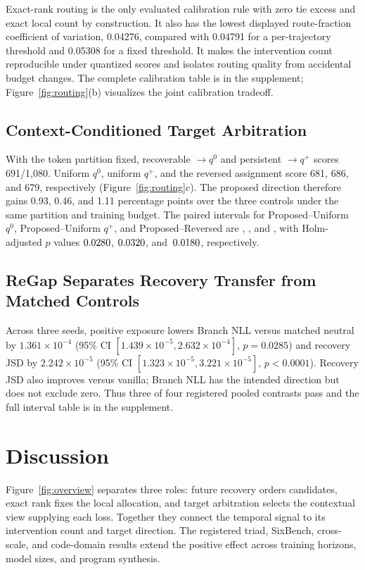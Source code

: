 \documentclass[letterpaper]{article}
\begin{document}
Exact-rank routing is the only evaluated calibration rule with zero tie excess
and exact local count by construction. It also has the lowest displayed
route-fraction coefficient of variation, 0.04276, compared with 0.04791 for a
per-trajectory threshold and 0.05308 for a fixed threshold. It makes the
intervention count reproducible under quantized scores
and isolates routing quality from accidental budget changes. The complete
calibration table is in the supplement; Figure~\ref{fig:routing}(b) visualizes
the joint calibration tradeoff.

\subsection{Context-Conditioned Target Arbitration}

With the token partition fixed, recoverable $\to q^0$ and persistent $\to q^+$
scores 691/1,080. Uniform $q^0$, uniform $q^+$, and the reversed assignment
score 681, 686, and 679, respectively (Figure~\ref{fig:routing}c). The proposed
direction therefore gains 0.93, 0.46, and 1.11 percentage points over the
three controls under the same partition and training budget. The paired
intervals for Proposed--Uniform $q^0$, Proposed--Uniform $q^+$, and
Proposed--Reversed are \ArbVsQZeroCI{}, \ArbVsQPlusCI{}, and
\ArbVsReversedCI{}, with Holm-adjusted $p$ values $0.0280$,
$0.0320$, and~$0.0180$, respectively.
\ArbitrationResultSentence{}

\subsection{ReGap Separates Recovery Transfer from Matched Controls}

Across three seeds, positive exposure lowers Branch NLL versus matched neutral
by $1.361\times10^{-4}$ (95\% CI
$[1.439\times10^{-5},2.632\times10^{-4}]$, $p=0.0285$) and recovery JSD by
$2.242\times10^{-5}$ (95\% CI
$[1.323\times10^{-5},3.221\times10^{-5}]$, $p<0.0001$). Recovery JSD also
improves versus vanilla; Branch NLL has the intended direction but does not
exclude zero. Thus three of four registered pooled contrasts pass
and the full interval table is in the supplement.

\section{Discussion}

Figure~\ref{fig:overview} separates three roles: future recovery orders
candidates, exact rank fixes the local allocation, and target arbitration
selects the contextual view supplying each loss. Together they connect the
temporal signal to its intervention count and target direction. The registered
triad, SixBench, cross-scale, and code-domain results extend the positive effect
across training horizons, model sizes, and program synthesis.
\end{document}

